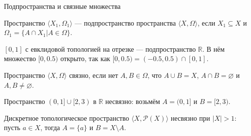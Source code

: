\documentclass[aspectratio=169]{beamer}
\begin{document}
\begin{frame}{Подпространства и связные множества}
\begin{defrus}Пространство $\langle X_1, \Omega_1\rangle$ --- подпространство пространства $\langle X, \Omega\rangle$,
если $X_1 \subseteq X$ и $\Omega_1 = \{ A\cap X_1 | A \in \Omega\}$.
\end{defrus}
\begin{exmprus} $[0,1]$ с евклидовой топологией на отрезке --- подпространство $\mathbb{R}$.
В нём множество $[0,0.5)$ открыто, так как $[0,0.5) = (-0.5,0.5) \cap [0,1]$.\end{exmprus}

\begin{defrus}Пространство $\langle X, \Omega\rangle$ связно, если нет $A,B \in \Omega$, что $A\cup B = X$,
$A \cap B = \varnothing$ и $A,B \ne \varnothing$.\end{defrus}

\begin{exmprus}Пространство $(0,1]\cup[2,3)$ в $\mathbb{R}$ несвязно: возьмём $A=(0,1]$ и $B = [2,3)$.

Дискретное топологическое пространство $\langle X, \mathcal{P}(X)\rangle$ несвязно при $|X| > 1$: пусть $a \in X$, 
тогда $A = \{a\}$ и $B = X \setminus A$.
\end{exmprus}
\end{frame}
\end{document}
